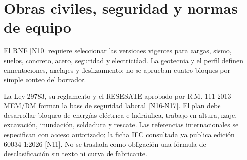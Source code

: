 \section{Obras civiles, seguridad y normas de equipo}
El RNE [N10] requiere seleccionar las versiones vigentes para cargas, sismo, suelos, concreto, acero, seguridad y electricidad. La geotecnia y el perfil definen cimentaciones, anclajes y deslizamiento; no se aprueban cuatro bloques por simple conteo del borrador.

La Ley 29783, su reglamento y el RESESATE aprobado por R.M. 111-2013-MEM/DM forman la base de seguridad laboral [N16-N17]. El plan debe desarrollar bloqueo de energías eléctrica e hidráulica, trabajo en altura, izaje, excavación, inundación, soldadura y rescate. Las referencias internacionales se especifican con acceso autorizado; la ficha IEC consultada ya publica edición 60034-1:2026 [N11]. No se traslada como obligación una fórmula de desclasificación sin texto ni curva de fabricante.

